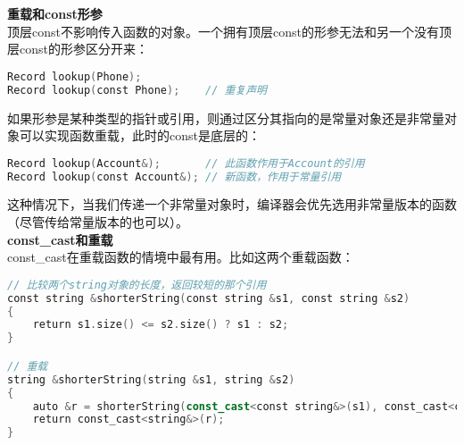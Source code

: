 \documentclass[
  a4paper,
  oneside,tablecaptionabove
]{scrbook}
\begin{document}
\textbf{重载和const形参}\\
顶层const不影响传入函数的对象。一个拥有顶层const的形参无法和另一个没有顶层const的形参区分开来：

\begin{lstlisting}[language={C++}]
Record lookup(Phone);
Record lookup(const Phone);    // 重复声明
\end{lstlisting}

如果形参是某种类型的指针或引用，则通过区分其指向的是常量对象还是非常量对象可以实现函数重载，此时的const是底层的：

\begin{lstlisting}[language={C++}]
Record lookup(Account&);       // 此函数作用于Account的引用
Record lookup(const Account&); // 新函数，作用于常量引用
\end{lstlisting}

这种情况下，当我们传递一个非常量对象时，编译器会优先选用非常量版本的函数（尽管传给常量版本的也可以）。\\
\textbf{const\_cast和重载}\\
const\_cast在重载函数的情境中最有用。比如这两个重载函数：

\begin{lstlisting}[language={C++}]
// 比较两个string对象的长度，返回较短的那个引用
const string &shorterString(const string &s1, const string &s2)
{
    return s1.size() <= s2.size() ? s1 : s2; 
}

// 重载
string &shorterString(string &s1, string &s2)
{
    auto &r = shorterString(const_cast<const string&>(s1), const_cast<const string&>(s2));
    return const_cast<string&>(r);
}
\end{lstlisting}
\end{document}
